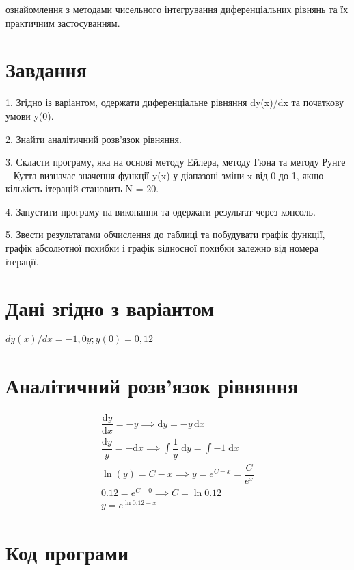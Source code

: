 \documentclass[a4paper, 12pt, oneside]{extarticle}
\renewcommand\Variant{$dy(x)/dx = -1,0 y;  y(0) = 0,12$}
\newcommand\tcobx[1]{
\begin{tcolorbox}[breakable, arc=0mm, colback=white, boxrule=0.2mm, beforeafter skip=0pt]
	#1
\end{tcolorbox}
}
\begin{document}
\Margins


\tcobx{
	ознайомлення з  методами чисельного інтегрування диференціальних
рівнянь та їх практичним застосуванням.
}

\section*{Завдання}
\tcobx{
	1. Згідно із варіантом, одержати диференціальне рівняння dy(x)/dx та початкову умови y(0).

2. Знайти аналітичний розв’язок рівняння.

3. Скласти програму, яка на основі методу Ейлера, методу Гюна та методу Рунге – Кутта визначає
значення функції y(x) у діапазоні зміни x від 0 до 1, якщо кількість ітерацій становить N = 20.

4. Запустити програму на виконання та одержати результат через консоль.

5. Звести результатами обчислення до таблиці та побудувати графік функції, графік абсолютної похибки і графік відносної похибки залежно від номера ітерації.
}

\section*{Дані згідно з варіантом}

\tcobx{
	\Variant
}

\section*{ Аналітичний розв'язок рівняння }

\tcobx{
\begin{align}
	\dfrac{\mathrm{d}y}{\mathrm{d}x}=-y \implies
	\mathrm{d}y=-y\,\mathrm{d}x \\
	\dfrac{\mathrm{d}y}{y}=-\mathrm{d}x \implies
	\int{\dfrac{1}{y}}{\;\mathrm{d}y}=\int{-1}{\;\mathrm{d}x} \\
	\ln\left(y\right)=C-x \implies
	y={e}^{C-x}=\dfrac{C}{{e}^{x}} \\
	0.12={e}^{C-0} \implies C = \ln 0.12 \\
	y = e^{\ln 0.12 - x}
\end{align}
}

\section*{ Код програми}

\tcobx {
	\inputminted{c++}{diff.cpp}
}
\end{document}
